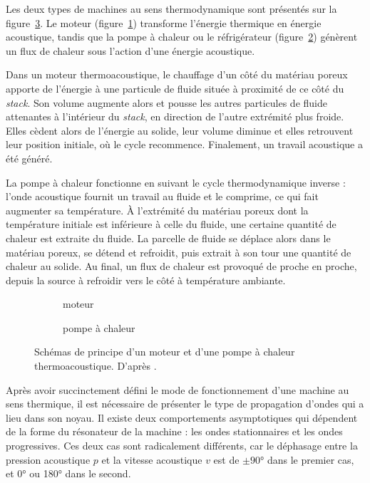 Les deux types de machines au sens thermodynamique sont présentés sur la figure~\ref{fig:MoteurVSFrigoTA}. Le moteur (figure~\ref{fig:MoteurTA}) transforme l’énergie thermique en énergie acoustique, tandis que la pompe à chaleur ou le réfrigérateur (figure~\ref{fig:FrigoTA}) génèrent un flux de chaleur sous l'action d'une énergie acoustique. 

Dans un moteur thermoacoustique, le chauffage d'un côté du matériau poreux apporte de l'énergie à une particule de fluide située à proximité de ce côté du \textit{stack}. Son volume augmente alors et pousse les autres particules de fluide attenantes à l'intérieur du \textit{stack}, en direction de l'autre extrémité plus froide. Elles cèdent alors de l'énergie au solide, leur volume diminue et elles retrouvent leur position initiale, où le cycle recommence. Finalement, un travail acoustique a été généré.

La pompe à chaleur fonctionne en suivant le cycle thermodynamique inverse : l'onde acoustique fournit un travail au fluide et le comprime, ce qui fait augmenter sa température. À l'extrémité du matériau poreux dont la température initiale est inférieure à celle du fluide, une certaine quantité de chaleur est extraite du fluide. La parcelle de fluide se déplace alors dans le matériau poreux, se détend et refroidit, puis extrait à son tour une quantité de chaleur au solide. Au final, un flux de chaleur est provoqué de proche en proche, depuis la source à refroidir vers le côté à température ambiante.\smallskip

\begin{figure}[!ht]
	\centering
	\begin{subfigure}{.47\textwidth}
		\centering
		
		\caption{moteur}
		\label{fig:MoteurTA}
	\end{subfigure}
	\hfill%
	\begin{subfigure}{.47\textwidth}
		\centering
		
		\caption{pompe à chaleur}
		\label{fig:FrigoTA}
	\end{subfigure}
	\caption[Schémas de principe d'un moteur et d'une pompe à chaleur thermoacoustique]{Schémas de principe d'un moteur et d'une pompe à chaleur thermoacoustique. D'après \cite{swift_thermoacoustics_2017}.}
	\label{fig:MoteurVSFrigoTA}
\end{figure}

Après avoir succinctement défini le mode de fonctionnement d'une machine au sens thermique, il est nécessaire de présenter le type de propagation d'ondes qui a lieu dans son noyau. Il existe deux comportements asymptotiques qui dépendent de la forme du résonateur de la machine : les ondes stationnaires et les ondes progressives. Ces deux cas sont radicalement différents, car le déphasage entre la pression acoustique $p$ et la vitesse acoustique $v$ est de $\pm\ang{90}$ dans le premier cas, et \ang{0} ou \ang{180} dans le second.

